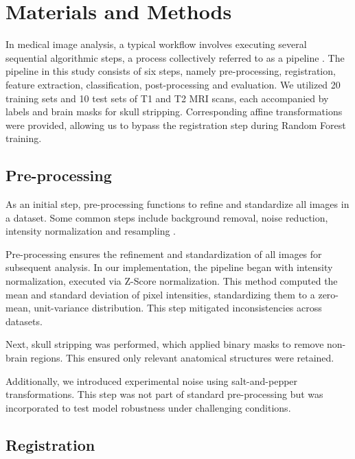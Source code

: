 \section{Materials and Methods}

In medical image analysis, a typical workflow involves executing several sequential algorithmic steps, a process collectively referred to as a pipeline \cite{b8}. The pipeline in this study consists of six steps, namely pre-processing, registration, feature extraction, classification, post-processing and evaluation. We utilized 20 training sets and 10 test sets of T1 and T2 MRI scans, each accompanied by labels and brain masks for skull stripping. Corresponding affine transformations were provided, allowing us to bypass the registration step during Random Forest training.

\subsection{Pre-processing}

As an initial step, pre-processing functions to refine and standardize all images in a dataset. Some common steps include background removal, noise reduction, intensity normalization and resampling \cite{b9}.

Pre-processing ensures the refinement and standardization of all images for subsequent analysis. In our implementation, the pipeline began with intensity normalization, executed via Z-Score normalization. This method computed the mean and standard deviation of pixel intensities, standardizing them to a zero-mean, unit-variance distribution. This step mitigated inconsistencies across datasets.

Next, skull stripping was performed, which applied binary masks to remove non-brain regions. This ensured only relevant anatomical structures were retained.

Additionally, we introduced experimental noise using salt-and-pepper transformations. This step was not part of standard pre-processing but was incorporated to test model robustness under challenging conditions.


\subsection{Registration}

